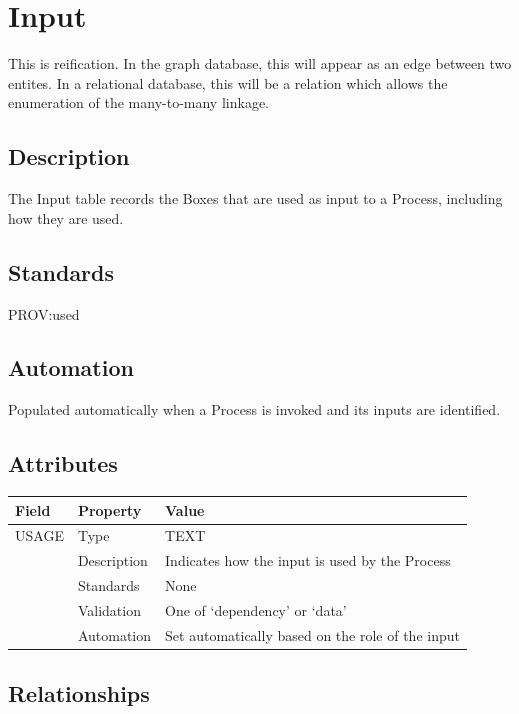 \section{Input}\label{input}

This is reification. In the graph database, this will appear as an edge
between two entites. In a relational database, this will be a relation
which allows the enumeration of the many-to-many linkage.

\subsection{Description}\label{description-15}

The Input table records the Boxes that are used as input to a Process,
including how they are used.

\subsection{Standards}\label{standards-17}

PROV:used

\subsection{Automation}\label{automation-17}

Populated automatically when a Process is invoked and its inputs are
identified.

\subsection{Attributes}\label{attributes-15}

\begin{longtable}[]{@{}lll@{}}
\toprule\noalign{}
Field & Property & Value \\
\midrule\noalign{}
\endhead
\bottomrule\noalign{}
\endlastfoot
USAGE & Type & TEXT \\
& Description & Indicates how the input is used by the Process \\
& Standards & None \\
& Validation & One of `dependency' or `data' \\
& Automation & Set automatically based on the role of the input \\
\end{longtable}

\subsection{Relationships}\label{relationships-13}


